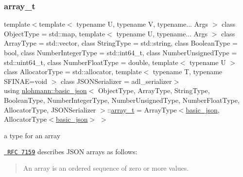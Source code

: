 \mbox{\label{classnlohmann_1_1basic__json_ae095578e03df97c5b3991787f1056374}} 
\subsubsection{\texorpdfstring{array\_t}{array\_t}}
{\footnotesize\ttfamily template$<$template$<$ typename U, typename V, typename... Args $>$ class Object\+Type = std\+::map, template$<$ typename U, typename... Args $>$ class Array\+Type = std\+::vector, class String\+Type  = std\+::string, class Boolean\+Type  = bool, class Number\+Integer\+Type  = std\+::int64\+\_\+t, class Number\+Unsigned\+Type  = std\+::uint64\+\_\+t, class Number\+Float\+Type  = double, template$<$ typename U $>$ class Allocator\+Type = std\+::allocator, template$<$ typename T, typename S\+F\+I\+N\+A\+E=void $>$ class J\+S\+O\+N\+Serializer = adl\+\_\+serializer$>$ \\
using \mbox{\hyperlink{classnlohmann_1_1basic__json}{nlohmann\+::basic\+\_\+json}}$<$ Object\+Type, Array\+Type, String\+Type, Boolean\+Type, Number\+Integer\+Type, Number\+Unsigned\+Type, Number\+Float\+Type, Allocator\+Type, J\+S\+O\+N\+Serializer $>$\+::\mbox{\hyperlink{classnlohmann_1_1basic__json_ae095578e03df97c5b3991787f1056374}{array\+\_\+t}} =  Array\+Type$<$\mbox{\hyperlink{classnlohmann_1_1basic__json}{basic\+\_\+json}}, Allocator\+Type$<$\mbox{\hyperlink{classnlohmann_1_1basic__json}{basic\+\_\+json}}$>$ $>$}



a type for an array 

\href{http://rfc7159.net/rfc7159}{\texttt{ R\+FC 7159}} describes J\+S\+ON arrays as follows\+: \begin{quote}
An array is an ordered sequence of zero or more values. \end{quote}


